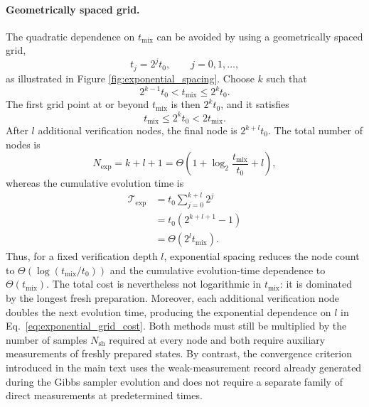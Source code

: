 \documentclass[showpacs,amsmath,amssymb,twocolumn,prx,superscriptaddress,10pt,aps,nofootinbib]{revtex4-2}
\begin{document}
\paragraph{Geometrically spaced grid.} 
The quadratic dependence on $t_{\mathrm{mix}}$ can be avoided by using a geometrically spaced grid,
\begin{equation}
    t_j = 2^j t_0,
    \qquad
    j=0,1,\ldots,
\end{equation}
as illustrated in Figure \ref{fig:exponential_spacing}. Choose $k$ such that
\begin{equation}
    2^{k-1}t_0
    <
    t_{\mathrm{mix}}
    \leq
    2^k t_0 .
    \label{eq:exponential_grid_k}
\end{equation}
The first grid point at or beyond $t_{\mathrm{mix}}$ is then $2^k t_0$, and it satisfies
\begin{equation}
    t_{\mathrm{mix}}
    \leq
    2^k t_0
    <
    2t_{\mathrm{mix}} .
\end{equation}
After $l$ additional verification nodes, the final node is $2^{k+l}t_0$. The total number of nodes is
\begin{equation}
    N_{\mathrm{exp}}
    =
    k+l+1
    =
    \Theta\!\left(
        1+\log_2\!\frac{t_{\mathrm{mix}}}{t_0}+l
    \right),
\end{equation}
whereas the cumulative evolution time is
\begin{align}
    \mathcal{T}_{\mathrm{exp}}
    &=
    t_0\sum_{j=0}^{k+l}2^j
    \nonumber\\
    &=
    t_0\left(2^{k+l+1}-1\right)
    \nonumber\\
    &=
    \Theta\!\left(
        2^l t_{\mathrm{mix}}
    \right).
    \label{eq:exponential_grid_cost}
\end{align}
Thus, for a fixed verification depth $l$, exponential spacing reduces the node count to $\Theta(\log(t_{\mathrm{mix}}/t_0))$ and the cumulative evolution-time dependence to $\Theta(t_{\mathrm{mix}})$. The total cost is nevertheless not logarithmic in $t_{\mathrm{mix}}$: it is dominated by the longest fresh preparation. Moreover, each additional verification node doubles the next evolution time, producing the exponential dependence on $l$ in Eq.~\eqref{eq:exponential_grid_cost}. Both methods must still be multiplied by the number of samples $N_{\mathrm{sh}}$ required at every node and both require auxiliary measurements of freshly prepared states. By contrast, the convergence criterion introduced in the main text uses the weak-measurement record already generated during the Gibbs sampler evolution and does not require a separate family of direct measurements at predetermined times.
\end{document}
